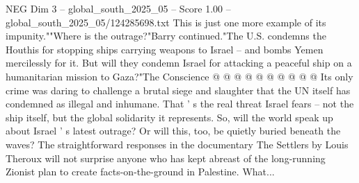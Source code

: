\begin{textsample}{NEG Dim 3 – global\_south\_2025\_05 – Score 1.00 – global\_south\_2025\_05/124285698.txt}
This is just one more example of its impunity.""Where is the outrage?"Barry continued."The U.S. condemns the Houthis for stopping ships carrying weapons to Israel -- and bombs Yemen mercilessly for it.
But will they condemn Israel for attacking a peaceful ship on a humanitarian mission to Gaza?"The Conscience @ @ @ @ @ @ @ @ @ @ Its only crime was daring to challenge a brutal siege and slaughter that the UN itself has condemned as illegal and inhumane.
That ' s the real threat Israel fears -- not the ship itself, but the global solidarity it represents.
So, will the world speak up about Israel ' s latest outrage?
Or will this, too, be quietly buried beneath the waves?
The straightforward responses in the documentary The Settlers by Louis Theroux will not surprise anyone who has kept abreast of the long-running Zionist plan to create facts-on-the-ground in Palestine.
What...

\end{textsample}
